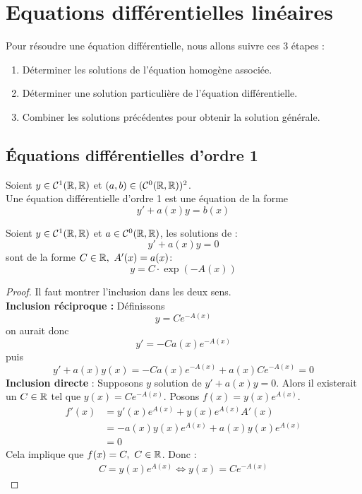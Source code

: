 \chapter{Equations différentielles linéaires}

\noindent Pour résoudre une équation différentielle, nous allons suivre ces 3 étapes :
\begin{enumerate}
	\item Déterminer les solutions de l'équation homogène associée.
	\item Déterminer une solution particulière de l'équation différentielle.
	\item Combiner les solutions précédentes pour obtenir la solution générale.
\end{enumerate}

\section{\'Equations différentielles d'ordre 1}

\begin{definition}
	Soient $y \in \mathcal{C}^1(\mathbb{R},\mathbb{R})$ et $(a, b) \in (\mathcal{C}^0(\mathbb{R},\mathbb{R}))^2$. \\
	Une équation différentielle d'ordre 1 est une équation de la forme
	\[ y' + a(x)y = b(x) \]
\end{definition}

\begin{theorem}
	Soient $y \in \mathcal{C}^1(\mathbb{R}, \mathbb{R})$ et $a \in \mathcal{C}^0(\mathbb{R}, \mathbb{R})$, les solutions de :
	\[ y' + a(x)y = 0 \]
	sont de la forme $C \in \mathbb{R},\ A'(x) = a(x)$:
	\[ y = C \cdot \exp(-A(x)) \]
\end{theorem}

\begin{proof}
    Il faut montrer l'inclusion dans les deux sens. \\
    \textbf{Inclusion réciproque :}
	Définissons
	\[ y = C e^{-A(x)} \]
	on aurait donc
	\[ y' = -C a(x)e^{-A(x)} \]
	puis
	\[ y' + a(x)y(x) = -C a(x) e^{-A(x)} + a(x)Ce^{-A(x)} = 0 \]
    \textbf{Inclusion directe} \cite{bibmath_resolution_eq_diff} :
    Supposons $y$ solution de $y' + a(x) y = 0$.
    Alors il existerait un $C \in \mathbb{R}$ tel que $y(x) = Ce^{-A(x)}$.
    Posons $f(x) = y(x)e^{A(x)}$.
    \begin{align*}
        f'(x) &= y'(x)e^{A(x)} + y(x)e^{A(x)}A'(x) \\
        &= -a(x)y(x)e^{A(x)} + a(x)y(x)e^{A(x)} \\
        &= 0
    \end{align*}
    Cela implique que $f(x) = C,\ C \in \mathbb{R}$. Donc :
    \begin{align*}
        C = y(x)e^{A(x)} \iff y(x) = Ce^{-A(x)}
    \end{align*}
\end{proof}

